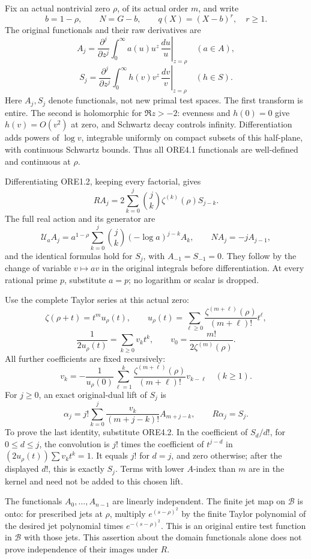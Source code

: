 Fix an actual nontrivial zero \(\rho\), of its actual order \(m\), and
write \[
b=1-\rho,\qquad N=G-b,\qquad q(X)=(X-b)^r,\quad r\ge1.
\] The original functionals and their raw derivatives are \[
A_j=\left.\frac{\partial^j}{\partial z^j}
\int_0^\infty a(u)u^z\,\frac{du}{u}\right|_{z=\rho}
\quad(a\in A),
\] \[
S_j=\left.\frac{\partial^j}{\partial z^j}
\int_0^\infty h(v)v^z\,\frac{dv}{v}\right|_{z=\rho}
\quad(h\in S).
\tag{ORE4.1}
\] Here \(A_j,S_j\) denote functionals, not new primal test spaces. The
first transform is entire. The second is holomorphic for \(\Re z>-2\):
evenness and \(h(0)=0\) give \(h(v)=O(v^2)\) at zero, and Schwartz decay
controls infinity. Differentiation adds powers of \(\log v\), integrable
uniformly on compact subsets of this half-plane, with continuous
Schwartz bounds. Thus all ORE4.1 functionals are well-defined and
continuous at \(\rho\).

Differentiating ORE1.2, keeping every factorial, gives \[
R A_j=2\sum_{k=0}^j\binom jk\zeta^{(k)}(\rho)S_{j-k}.
\tag{ORE4.2}
\] The full real action and its generator are \[
\mathcal U_a A_j
=a^{1-\rho}\sum_{k=0}^j\binom jk(-\log a)^{j-k}A_k,
\qquad
N A_j=-j A_{j-1},
\tag{ORE4.3}
\] and the identical formulas hold for \(S_j\), with
\(A_{-1}=S_{-1}=0\). They follow by the change of variable
\(v\mapsto av\) in the original integrals before differentiation. At
every rational prime \(p\), substitute \(a=p\); no logarithm or scalar
is dropped.

Use the complete Taylor series at this actual zero: \[
\zeta(\rho+t)=t^m u_\rho(t),\qquad
u_\rho(t)=\sum_{\ell\ge0}
\frac{\zeta^{(m+\ell)}(\rho)}{(m+\ell)!}t^\ell,
\] \[
\frac1{2u_\rho(t)}=\sum_{k\ge0}v_k t^k,\qquad
v_0=\frac{m!}{2\zeta^{(m)}(\rho)}.
\tag{ORE4.4}
\] All further coefficients are fixed recursively: \[
v_k=-\frac1{u_\rho(0)}
\sum_{\ell=1}^k\frac{\zeta^{(m+\ell)}(\rho)}
{(m+\ell)!}v_{k-\ell}\quad(k\ge1).
\tag{ORE4.5}
\] For \(j\ge0\), an exact original-dual lift of \(S_j\) is \[
\alpha_j
=j!\sum_{k=0}^j
\frac{v_k}{(m+j-k)!}A_{m+j-k},
\qquad R\alpha_j=S_j.
\tag{ORE4.6}
\] To prove the last identity, substitute ORE4.2. In the coefficient of
\(S_d/d!\), for \(0\le d\le j\), the convolution is \(j!\) times the
coefficient of \(t^{j-d}\) in \((2u_\rho(t))\sum v_kt^k=1\). It equals
\(j!\) for \(d=j\), and zero otherwise; after the displayed \(d!\), this
is exactly \(S_j\). Terms with lower \(A\)-index than \(m\) are in the
kernel and need not be added to this chosen lift.

The functionals \(A_0,\ldots,A_{n-1}\) are linearly independent. The
finite jet map on \(\mathcal B\) is onto: for prescribed jets at
\(\rho\), multiply \(e^{(s-\rho)^2}\) by the finite Taylor polynomial of
the desired jet polynomial times \(e^{-(s-\rho)^2}\). This is an
original entire test function in \(\mathcal B\) with those jets. This
assertion about the domain functionals alone does not prove independence
of their images under \(R\).

